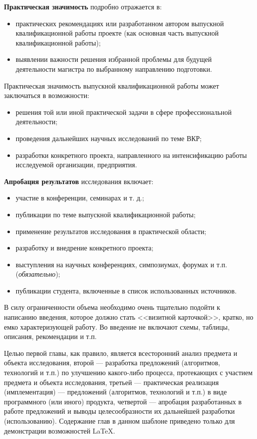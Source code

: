 \textbf{Практическая значимость} подробно отражается в:
\begin{itemize}
	\item практических рекомендациях или разработанном автором выпускной квалификационной работы проекте (как основная часть выпускной квалификационной работы);
	\item выявлении важности решения избранной проблемы для будущей деятельности магистра по выбранному направлению подготовки.
\end{itemize} 

Практическая значимость выпускной квалификационной работы может заключаться в возможности:

\begin{itemize}
	\item решения той или иной практической задачи в сфере профессиональной деятельности;
	\item проведения дальнейших научных исследований по теме ВКР;
	\item разработки конкретного проекта, направленного на интенсификацию работы исследуемой организации, предприятия.
\end{itemize}

\textbf{Апробация результатов} исследования включает:
\begin{itemize}
	\item участие в конференции, семинарах и т. д.;
	\item публикации по теме выпускной квалификационной работы;
	\item применение результатов исследования в практической области;
	\item разработку и внедрение конкретного проекта;
	\item выступления на научных конференциях, симпозиумах, форумах и т.п. (\textit{обязательно});
	\item публикации студента, включенные в список использованных источников. 
\end{itemize}


В силу ограниченности объема необходимо очень тщательно подойти к написанию введения, которое должно стать <<визитной карточкой>>, кратко, но емко характеризующей работу. Во введение не включают схемы, таблицы, описания, рекомендации и т.п. 

Целью первой главы, как правило, является всесторонний анализ предмета и объекта исследования, второй --- разработка предложений (алгоритмов, технологий и т.п.) по улучшению какого-либо процесса, протекающих с участием предмета и объекта исследования, третьей --- практическая реализация (имплементация) --- предложений (алгоритмов, технологий и т.п.) в виде программного (или иного) продукта, четвертой --- апробация разработанных в работе предложений и выводы целесообразности их дальнейшей разработки (использованию). 
Содержание глав в данном шаблоне приведено только для демонстрации возможностей \LaTeX.



